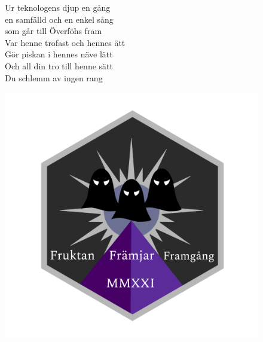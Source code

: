 \documentclass[a6paper, 10pt, twoside]{article}
\begin{document}
\noindent
\begin{center}
\end{center}
\vspace{-15pt}
\begin{lyrics}
\begin{figure}[!h]
\begin{minipage}{0.60\linewidth}
\small Ur teknologens djup en gång\\
en samfälld och en enkel sång\\
som går till Överföhs fram
\vspace{5pt}\\
Var henne trofast och hennes ätt\\
Gör piskan i hennes näve lätt\\
Och all din tro till henne sätt\\
Du schlemm av ingen rang
\end{minipage}
\begin{minipage}{0.38\linewidth}
\includegraphics[width=\textwidth]{loggan.png}
\end{minipage}
\end{figure}
\end{lyrics}
\vspace{-10pt}
\vspace{10pt}
\end{document}
